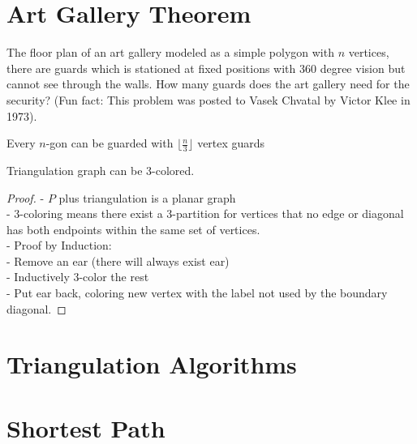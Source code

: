 		\section{Art Gallery Theorem}
			\begin{problem}
				The floor plan of an art gallery modeled as a simple polygon with $n$ vertices, there are guards which is stationed at fixed positions with 360 degree vision but cannot see through the walls. How many guards does the art gallery need for the security? (Fun fact: This problem was posted to Vasek Chvatal by Victor Klee in 1973).				
			\end{problem}
			\begin{theorem}
				Every $n$-gon can be guarded with $\lfloor \frac{n}{3} \rfloor$ vertex guards
			\end{theorem}
			\begin{lemma}
				Triangulation graph can be 3-colored.
			\end{lemma}
			\begin{proof}
				- $P$ plus triangulation is a planar graph\\
				- 3-coloring means there exist a 3-partition for vertices that no edge or diagonal has both endpoints within the same set of vertices.\\
				- Proof by Induction:\\
				\indent - Remove an ear (there will always exist ear) \\
				\indent - Inductively 3-color the rest\\
				\indent - Put ear back, coloring new vertex with the label not used by the boundary diagonal.
			\end{proof}

		\section{Triangulation Algorithms}

		\section{Shortest Path}


